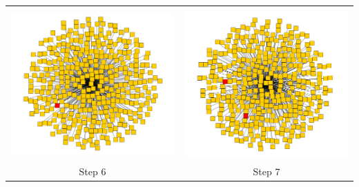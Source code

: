 \documentclass[12pt, oneside, openany]{article} %
\newcommand\Bstrut{\rule[-0.9ex]{0pt}{0pt}} %
\begin{document}
\begin{table}[p]
\centering
\vspace{-1cm}
\begin{tabular}{| c | c |}
	\hline
	&\\
   	\includegraphics[scale=0.11]{comp6.png} & \includegraphics[scale=0.11]{comp7.png} \\
	Step 6 & Step 7 \Bstrut \\
   	\hline

\end{tabular}
\end{table}
\end{document}
